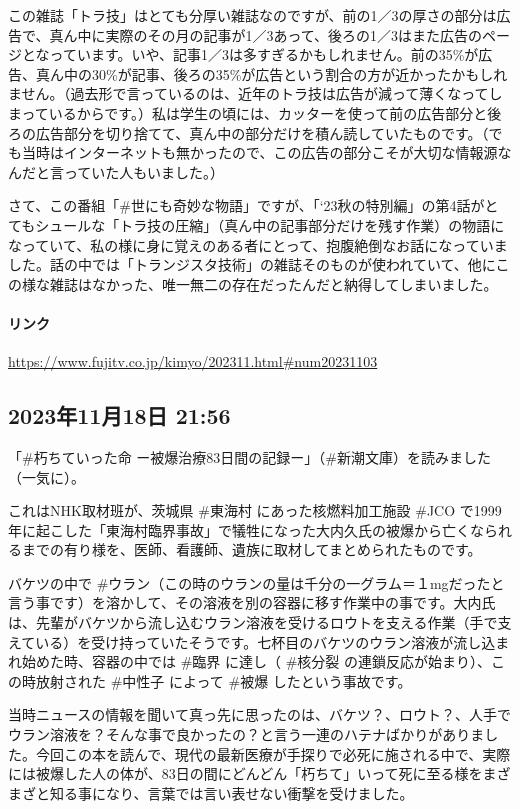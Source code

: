 この雑誌「トラ技」はとても分厚い雑誌なのですが、前の1／3の厚さの部分は広告で、真ん中に実際のその月の記事が1／3あって、後ろの1／3はまた広告のページとなっています。いや、記事1／3は多すぎるかもしれません。前の35\%が広告、真ん中の30\%が記事、後ろの35\%が広告という割合の方が近かったかもしれません。（過去形で言っているのは、近年のトラ技は広告が減って薄くなってしまっているからです。）私は学生の頃には、カッターを使って前の広告部分と後ろの広告部分を切り捨てて、真ん中の部分だけを積ん読していたものです。（でも当時はインターネットも無かったので、この広告の部分こそが大切な情報源なんだと言っていた人もいました。）

さて、この番組「\#世にも奇妙な物語」ですが、「‘23秋の特別編」の第4話がとてもシュールな「トラ技の圧縮」（真ん中の記事部分だけを残す作業）の物語になっていて、私の様に身に覚えのある者にとって、抱腹絶倒なお話になっていました。話の中では「トランジスタ技術」の雑誌そのものが使われていて、他にこの様な雑誌はなかった、唯一無二の存在だったんだと納得してしまいました。

\paragraph{リンク}
\url{https://www.fujitv.co.jp/kimyo/202311.html#num20231103}

\subsection*{2023年11月18日 21:56}

「\#朽ちていった命 ー被爆治療83日間の記録ー」（\#新潮文庫）を読みました（一気に）。

これはNHK取材班が、茨城県 \#東海村 にあった核燃料加工施設 \#JCO で1999年に起こした「東海村臨界事故」で犠牲になった大内久氏の被爆から亡くなられるまでの有り様を、医師、看護師、遺族に取材してまとめられたものです。

バケツの中で \#ウラン（この時のウランの量は千分の一グラム＝１mgだったと言う事です）を溶かして、その溶液を別の容器に移す作業中の事です。大内氏は、先輩がバケツから流し込むウラン溶液を受けるロウトを支える作業（手で支えている）を受け持っていたそうです。七杯目のバケツのウラン溶液が流し込まれ始めた時、容器の中では \#臨界 に達し（ \#核分裂 の連鎖反応が始まり）、この時放射された \#中性子 によって \#被爆 したという事故です。

当時ニュースの情報を聞いて真っ先に思ったのは、バケツ？、ロウト？、人手でウラン溶液を？そんな事で良かったの？と言う一連のハテナばかりがありました。今回この本を読んで、現代の最新医療が手探りで必死に施される中で、実際には被爆した人の体が、83日の間にどんどん「朽ちて」いって死に至る様をまざまざと知る事になり、言葉では言い表せない衝撃を受けました。


